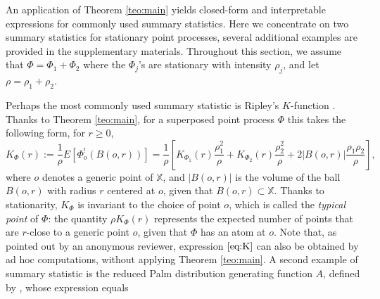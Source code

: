 \documentclass[11pt,a4paper,oneside]{article}
\newcommand{\E}{E}
\newcommand{\X}{\mathbb{X}}
\newcommand{\prob}{{\rm pr}}
\theoremstyle{definition}
\theoremstyle{remark}
\begin{document}
An application of Theorem \ref{teo:main} yields closed-form and interpretable expressions for commonly used summary statistics.
Here we concentrate on two summary statistics for stationary point processes, several additional examples are provided in the supplementary materials. Throughout this section, we assume that $\Phi = \Phi_1 + \Phi_2$ where the $\Phi_j$'s are stationary with intensity  $ \rho_j$, and let $\rho = \rho_1 + \rho_2$.

Perhaps the most commonly used summary statistic is Ripley's $K$-function \citep{ripley1976second}. Thanks to Theorem \ref{teo:main}, for a superposed point process $\Phi$ this takes the following form, for $r \ge 0$,
\begin{equation} \label{eq:K}
    K_{\Phi}(r) := \frac{1}{\rho} \E[\Phi^!_{o}(B(o,r))] =
   \frac{1}{\rho} \left[ K_{\Phi_1}(r) \frac{\rho_1^2}{\rho}+ K_{\Phi_2}(r) \frac{\rho_2^2}{\rho}+ 2 |B(o,r)| \frac{\rho_1\rho_2}{\rho}   \right],
\end{equation} 
where $o$ denotes a generic point of $\X$, and $|B(o, r)|$ is the volume of the ball $B(o, r)$ with radius $r$ centered at $o$, given that  $ B(o, r) \subset \X$.
Thanks to stationarity, $K_{\Phi}$ is invariant to the choice of point $o$, which is called the \emph{typical point} of $\Phi$: the quantity $\rho K_{\Phi}(r)$ represents the expected number of points that are $r$-close to a generic point $o$, given that $\Phi$ has an atom at $o$.  Note that, as pointed out by an anonymous reviewer, expression $\eqref{eq:K}$ can also be obtained by ad hoc computations, without applying Theorem \ref{teo:main}. %
A second example of summary statistic  is the reduced Palm distribution generating function $A$, defined by \cite{chiu2008reduced}, whose expression equals
\end{document}

